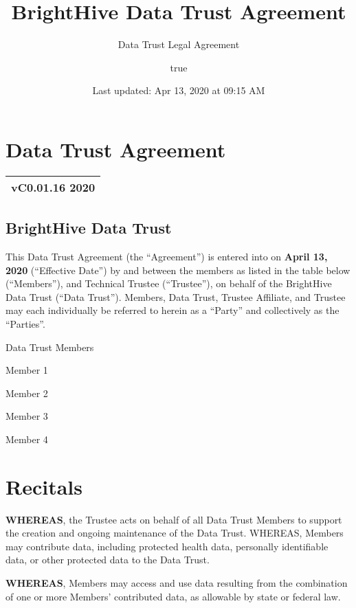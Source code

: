 \documentclass[]{book}
\title{BrightHive Data Trust Agreement}
\subtitle{Data Trust Legal Agreement}
\author{true}
\date{Last updated: Apr 13, 2020 at 09:15 AM}
\begin{document}
\maketitle

{
\setcounter{tocdepth}{1}
\tableofcontents
}
\hypertarget{data-trust-agreement}{%
\chapter*{Data Trust Agreement}\label{data-trust-agreement}}

\begin{longtable}[]{@{}l@{}}
\toprule
\endhead
\textbf{vC0.01.16 2020}\tabularnewline
\bottomrule
\end{longtable}

\hypertarget{brighthive-data-trust}{%
\section*{BrightHive Data Trust}\label{brighthive-data-trust}}

This Data Trust Agreement (the ``Agreement'') is entered into on \textbf{April 13, 2020} (``Effective Date'') by and between the members as listed in the table below (``Members''), and Technical Trustee (``Trustee''), on behalf of the BrightHive Data Trust (``Data Trust''). Members, Data Trust, Trustee Affiliate, and Trustee may each individually be referred to herein as a ``Party'' and collectively as the ``Parties''.

Data Trust Members

Member 1

Member 2

Member 3

Member 4

\hypertarget{recitals}{%
\chapter{Recitals}\label{recitals}}

\textbf{WHEREAS}, the Trustee acts on behalf of all Data Trust Members to support the creation and ongoing maintenance of the Data Trust. WHEREAS, Members may contribute data, including protected health data, personally identifiable data, or other protected data to the Data Trust.

\textbf{WHEREAS}, Members may access and use data resulting from the combination of one or more Members' contributed data, as allowable by state or federal law.
\end{document}
